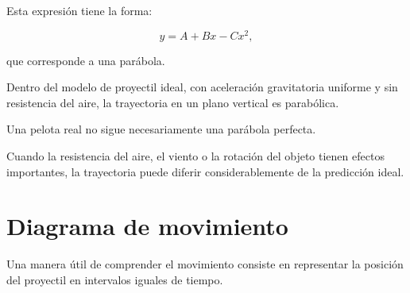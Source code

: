 Esta expresión tiene la forma:

\[
y=A+Bx-Cx^2,
\]

que corresponde a una parábola.

\begin{principio}
Dentro del modelo de proyectil ideal, con aceleración gravitatoria uniforme y
sin resistencia del aire, la trayectoria en un plano vertical es parabólica.
\end{principio}

\begin{advertencia}
Una pelota real no sigue necesariamente una parábola perfecta.

Cuando la resistencia del aire, el viento o la rotación del objeto tienen
efectos importantes, la trayectoria puede diferir considerablemente de la
predicción ideal.
\end{advertencia}


\section{Diagrama de movimiento}

Una manera útil de comprender el movimiento consiste en representar la posición
del proyectil en intervalos iguales de tiempo.

\begin{center}
\end{center}

